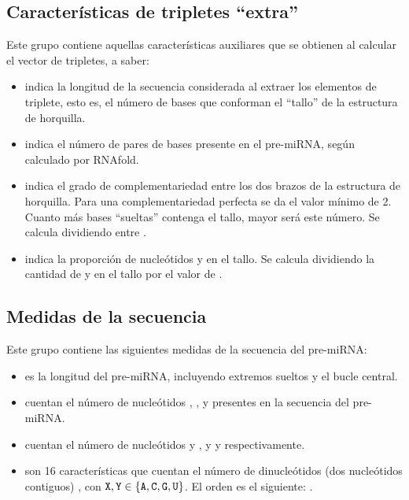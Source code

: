 \documentclass[12pt,bibliography=oldstyle,DIV=12,parskip=half-,titlepage]{scrartcl}
\begin{document}
\subsection{Características de tripletes ``extra''}
Este grupo contiene aquellas características auxiliares que se obtienen
al calcular el vector de tripletes, a saber:
\begin{itemize}
\item{} indica la longitud de la secuencia considerada al
  extraer los elementos de triplete, esto es, el número de bases que
  conforman el ``tallo'' de la estructura de horquilla.
\item{} indica el número de pares de bases presente en
  el pre-miRNA, según calculado por RNAfold.
\item{} indica el grado de complementariedad
  entre los dos brazos de la estructura de horquilla. Para una
  complementariedad perfecta se da el valor mínimo de 2. Cuanto más
  bases ``sueltas'' contenga el tallo, mayor será este número. Se
  calcula dividiendo  entre .
\item{} indica la proporción de nucleótidos  y
   en el tallo. Se calcula dividiendo la cantidad de 
  y  en el tallo por el valor de .
\end{itemize}
%
\subsection{Medidas de la secuencia}
Este grupo contiene las siguientes medidas de la secuencia del pre-miRNA:
\begin{itemize}
\item{} es la longitud del pre-miRNA, incluyendo extremos sueltos
  y el bucle central.
\item{} cuentan el número de nucleótidos ,
  ,  y  presentes en la secuencia del
  pre-miRNA.
\item{} cuentan el número de nucleótidos  y
  , y  y  respectivamente.
\item{} son 16 características que cuentan el número de
  dinucleótidos (dos nucleótidos contiguos) , con
  ${\tt X,Y}\in\{{\tt A,C,G,U}\}$. El orden es el siguiente:
  .
\end{itemize}
%
\end{document}
